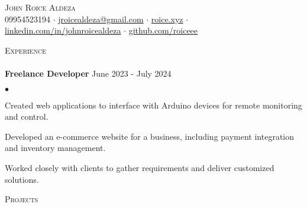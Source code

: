 \documentclass[a4paper]{article}
\newcommand{\lineunder} {
        \vspace*{-8pt} \\
        \hspace*{-18pt} \hrulefill \\
    }
\newcommand{\header} [1] {
        {\vspace*{4mm} \hspace*{-18pt}\vspace*{8pt} \textsc{#1}}
        \vspace*{-6pt} \lineunder
    }
\newenvironment{achievements}{
        \begin{list}
            {$\bullet$}{\topsep 0pt \itemsep -2pt}}{\vspace*{4pt}
        \end{list}
    }
\begin{document}
    \vspace*{-40pt}

    \begin{center}
        {\Huge \scshape {John Roice Aldeza}}\\
        \vspace{2mm}
    09954523194 $\cdot$ \href{mailto:jroicealdeza@gmail.com}{jroicealdeza@gmail.com} $\cdot$ \href{https://roice.xyz}{roice.xyz} $\cdot$ \href{https://www.linkedin.com/in/johnroicealdeza}{linkedin.com/in/johnroicealdeza} $\cdot$ 
    \href{https://www.github.com/roiceee}{github.com/roiceee}
    \end{center}
    \vspace{-8pt}

    \header{Experience}

    {\textbf{Freelance Developer}} \hfill June 2023 - July 2024\\
    \vspace{1mm}
    \begin{achievements}
        \item Created web applications to interface with Arduino devices for remote monitoring and control.
        \item Developed an e-commerce website for a business, including payment integration and inventory management.
        \item Worked closely with clients to gather requirements and deliver customized solutions.
    \end{achievements}
    \vspace*{3mm}
    \vspace{-8pt}
    
    \header{Projects}
\end{document}
